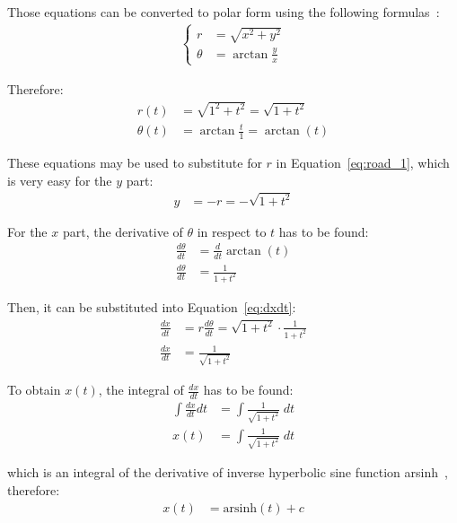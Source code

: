 \documentclass[12pt]{article}
\begin{document}
        Those equations can be converted to polar form using the following formulas~\cite{polar_rectangular}:
        \begin{align}
            \begin{cases}
                r &= \sqrt{x^2 + y^2} \\
                \theta &= \arctan\frac{y}{x}
            \end{cases}
        \end{align}

        Therefore:
        \begin{align}
            r(t) &= \sqrt{1^2 + t^2} = \sqrt{1+t^2} \\
            \theta(t) &= \arctan\frac{t}{1} = \arctan(t)
        \end{align}

        These equations may be used to substitute for $r$ in Equation~\ref{eq:road_1}, which is very easy for the $y$ part:
        \begin{align}
            y &= -r = -\sqrt{1+t^2}
        \end{align}

        For the $x$ part, the derivative of $\theta$ in respect to $t$ has to be found:
        \begin{align}
            \frac{d\theta}{dt} &= \frac{d}{dt} \arctan(t) \\
            \frac{d\theta}{dt} &= \frac{1}{1+t^2}
        \end{align}

        Then, it can be substituted into Equation~\ref{eq:dxdt}:
        \begin{align}
            \frac{dx}{dt} &= r \frac{d\theta}{dt} = \sqrt{1+t^2} \cdot \frac{1}{1+t^2} \\
            \frac{dx}{dt} &= \frac{1}{\sqrt{1+t^2}}
        \end{align}

        To obtain $x(t)$, the integral of $\frac{dx}{dt}$ has to be found:
        \begin{align}
            \int \frac{dx}{dt} dt &= \int \frac{1}{\sqrt{1+t^2}} \;dt \\
            x(t) &= \int \frac{1}{\sqrt{1+t^2}} \;dt
        \end{align}

        which is an integral of the derivative of inverse hyperbolic sine function arsinh~\cite{oxford_dict}, therefore:
        \begin{align}
            x(t) &= \text{arsinh}(t) + c 
        \end{align}
\end{document}
